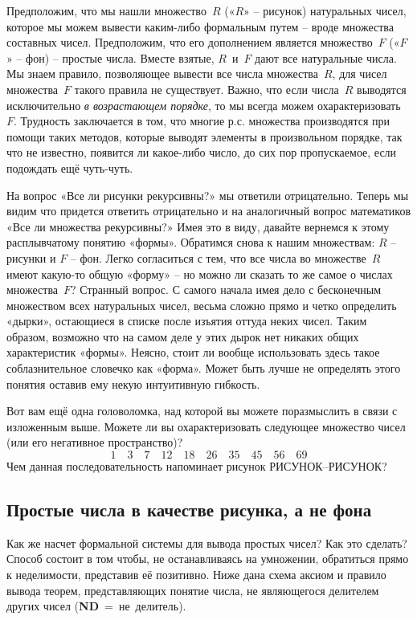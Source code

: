\documentclass[../main.tex]{subfiles}
\begin{document}
Предположим, что мы нашли множество~$R$ («$R$» \--- рисунок) натуральных чисел, которое мы можем вывести каким-либо формальным путем \--- вроде множества составных чисел. Предположим, что его дополнением является множество~$F$ («$F$» \--- фон) \--- простые числа.
Вместе взятые, $R$~и~$F$ дают все натуральные числа.
Мы знаем правило, позволяющее вывести все числа множества~$R$, для чисел множества~$F$ такого правила не существует.
Важно, что если числа~$R$ выводятся исключительно \emph{в возрастающем порядке}, то мы всегда можем охарактеризовать~$F$.
Трудность заключается в том, что многие р.с. множества производятся при помощи таких методов, которые выводят элементы в произвольном порядке, так что не известно, появится ли какое-либо число, до сих пор пропускаемое, если подождать ещё чуть-чуть.

На вопрос «Все ли рисунки рекурсивны?» мы ответили отрицательно.
Теперь мы видим что придется ответить отрицательно и на аналогичный вопрос математиков «Все ли множества рекурсивны?»
Имея это в виду, давайте вернемся к этому расплывчатому понятию «формы».
Обратимся снова к нашим множествам: $R$ \--- рисунки и $F$ \--- фон.
Легко согласиться с тем, что все числа во множестве~$R$ имеют какую-то общую «форму» \--- но можно ли сказать то же самое о числах множества~$F$?
Странный вопрос.
С самого начала имея дело с бесконечным множеством всех натуральных чисел, весьма сложно прямо и четко определить «дырки», остающиеся в списке после изъятия оттуда неких чисел.
Таким образом, возможно что на самом деле у этих дырок нет никаких общих характеристик «формы».
Неясно, стоит ли вообще использовать здесь такое соблазнительное словечко как «форма».
Может быть лучше не определять этого понятия оставив ему некую интуитивную гибкость.

Вот вам ещё одна головоломка, над которой вы можете поразмыслить в связи с изложенным выше.
Можете ли вы охарактеризовать следующее множество чисел (или его негативное пространство)?
\[
    1 \quad 3 \quad 7 \quad 12 \quad 18 \quad 26 \quad 35 \quad 45 \quad 56 \quad 69
\]
Чем данная последовательность напоминает рисунок РИСУНОК--РИСУНОК?


\subsection{Простые числа в качестве рисунка, а не фона}

Как же насчет формальной системы для вывода простых чисел?
Как это сделать?
Способ состоит в том чтобы, не останавливаясь на умножении, обратиться прямо к неделимости, представив её позитивно.
Ниже дана схема аксиом и правило вывода теорем, представляющих понятие числа, не являющегося делителем других чисел (\textbf{ND}~=~не~делитель).
\end{document}
